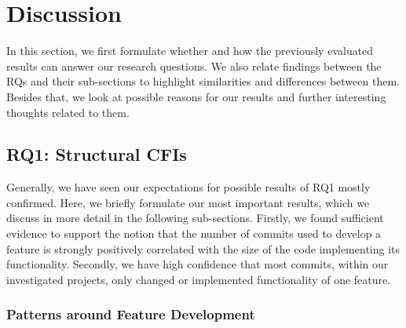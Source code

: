 \clearpage 

\section{Discussion}\label{sec:discussion}

In this section, we first formulate whether and how the previously evaluated results can answer our research questions.
We also relate findings between the RQs and their sub-sections to highlight similarities and differences between them.
Besides that, we look at possible reasons for our results and further interesting thoughts related to them.

\subsection*{\textbf{RQ1: Structural CFIs}}\label{sec:disc_struc_cfis}

Generally, we have seen our expectations for possible results of RQ1 mostly confirmed.
Here, we briefly formulate our most important results, which we discuss in more detail in the following sub-sections.
Firstly, we found sufficient evidence to support the notion that the number of commits used to develop a feature is strongly positively correlated with the size of the code implementing its functionality. 
Secondly, we have high confidence that most commits, within our investigated projects, only changed or implemented functionality of one feature.

\subsubsection*{Patterns around Feature Development}

